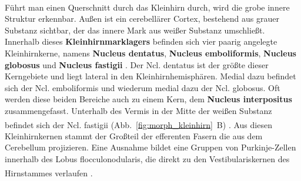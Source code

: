 \documentclass[12pt,a4paper,pdftex]{article}
\begin{document}
\\ \noindent Führt man einen Querschnitt durch das Kleinhirn durch, wird die grobe innere Struktur erkennbar. Außen ist ein cerebellärer Cortex, bestehend aus grauer Substanz sichtbar, der das innere Mark aus weißer Substanz umschließt. Innerhalb dieses \textbf{Kleinhirnmarklagers} befinden sich vier paarig angelegte Kleinhirnkerne, namens \textbf{Nucleus dentatus}, \textbf{Nucleus emboliformis}, \textbf{Nucleus globosus} und \textbf{Nucleus fastigii} . Der Ncl. dentatus ist der größte dieser Kerngebiete und liegt lateral in den Kleinhirnhemisphären. Medial dazu befindet sich der Ncl. emboliformis und wiederum medial dazu der Ncl. globosus. Oft werden diese beiden Bereiche auch zu einem Kern, dem \textbf{Nucleus interpositus} zusammengefasst. Unterhalb des Vermis in der Mitte der weißen Substanz befindet sich der Ncl. fastigii (Abb.~\ref{fig:morph_kleinhirn}~B) \textsuperscript{\cite[7]{trepel2011neuroanatomie}}. Aus diesen Kleinhirnkernen stammt der Großteil der efferenten Fasern die aus dem Cerebellum projizieren. Eine Ausnahme bildet eine Gruppen von Purkinje-Zellen innerhalb des Lobus flocculonodularis, die direkt zu den Vestibulariskernen des Hirnstammes verlaufen \textsuperscript{\cite[42]{kandel2013principles}}. 
\end{document}
